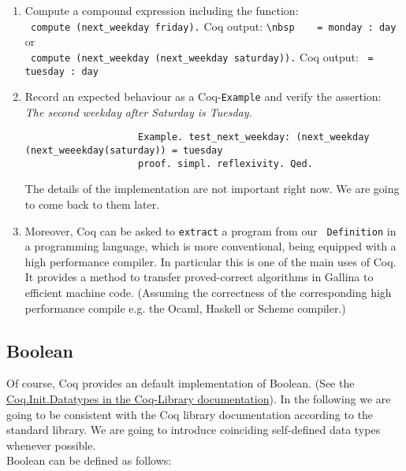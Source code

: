 	   \begin{enumerate}
	   \item Compute a compound expression including the function:\\ 		
	 		 \lstinline! compute (next_weekday friday).! Coq output: \lstinline!\nbsp	 = monday : day ! or \\
	 		 \lstinline! compute (next_weekday (next_weekday saturday)).! Coq output: \lstinline! = tuesday : day !\\ 	      
	   \item Record an expected behaviour as a Coq-\lstinline!Example! and verify the assertion:\\ 
	         {\itshape The second weekday after Saturday is Tuesday.}     
			   \begin{lstlisting}
			   		Example. test_next_weekday: (next_weekday (next_weeekday(saturday)) = tuesday 
			   		proof. simpl. reflexivity. Qed.
			   \end{lstlisting}
	   			The details of the implementation are not important right now. 
	   			We are going to come back to them later.
	   
	   \item \label{CoqAsCodeGen} Moreover, Coq can be asked to \lstinline!extract! a program from our \lstinline! Definition! in a programming language, which is more conventional, being equipped with a high performance compiler.
	    In particular this is one of the main uses of Coq. 
	    It provides a method to transfer proved-correct algorithms in Gallina to efficient machine code.
	    (Assuming the correctness of the corresponding high performance compile e.g. the Ocaml, Haskell or Scheme compiler.) 			
	   \end{enumerate}   
	
	\subsection{Boolean}
	
	    Of course, Coq provides an default implementation of Boolean.
	    (See the \newline \href{https://www.cs.princeton.edu/courses/archive/fall07/cos595/stdlib/html/Coq.Init.Datatypes.html}{Coq.Init.Datatypes in the Coq-Library documentation}).  
	    In the following we are going to be consistent with the Coq library documentation according to the standard library.
	    We are going to introduce coinciding self-defined data types whenever possible.\\
	    Boolean can be defined as follows:
	    
